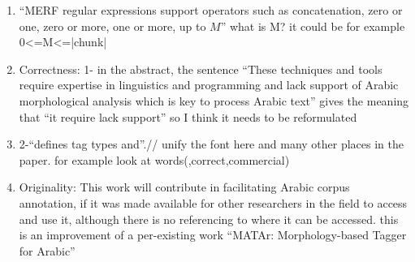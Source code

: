 \begin{enumerate}[leftmargin=0mm,label=\bfseries CommentR3.\arabic*]


\item \label{Review.3.25}
``MERF regular expressions support operators such as concatenation, zero or one, zero or more, one or more, up to $M$” what is M? 
it could be for example 0<=M<=|chunk| 




\item \label{Review.3.25}
Correctness: 
1- in the abstract, the sentence ``These techniques and 
tools require expertise in linguistics and programming and 
lack support of Arabic morphological analysis which is key to 
process Arabic text''
gives the meaning that ``it require lack support'' so I think it 
needs to be reformulated 



\item \label{Review.3.25}
2-``defines tag types and''.// unify the font here and 
many other places in the paper. 
for example look at words(,correct,commercial)


\item \label{Review.3.25}
Originality:  
This work will contribute in facilitating Arabic corpus 
annotation, if it was made available for other researchers in 
the field to access and use it, although there is no 
referencing to where it can be accessed. 
this is an improvement of a per-existing work ``MATAr: Morphology-based Tagger for Arabic''



\end{enumerate}
